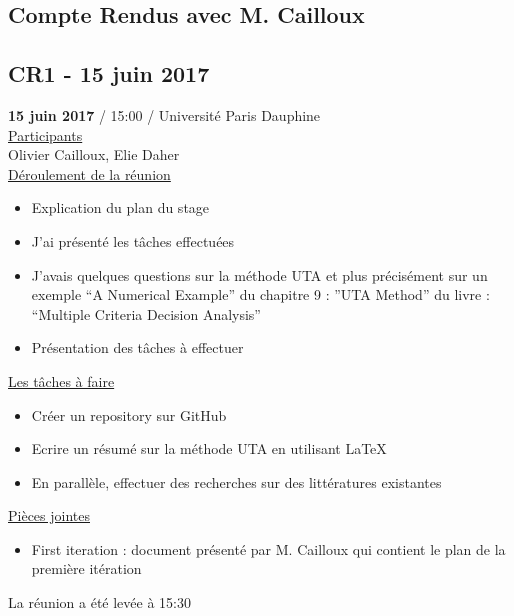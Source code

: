 \documentclass{report}
\begin{document}
\begin{appendices}

\chapter{Compte Rendus avec M. Cailloux}
\section{CR1 - 15 juin 2017}
\textbf{15 juin 2017} / 15:00 / Université Paris Dauphine \\

\underline{Participants} \\

Olivier Cailloux, Elie Daher\\

\underline{Déroulement de la réunion}\\
\begin{itemize}
	\item Explication du plan du stage
	\item J’ai présenté les tâches effectuées
	\item J’avais quelques questions sur la méthode UTA et plus précisément sur un exemple “A Numerical Example” du chapitre 9 : ”UTA Method” du livre : “Multiple Criteria Decision Analysis”
	\item Présentation des tâches à effectuer\\
\end{itemize}

\underline{Les tâches à faire} \\
\begin{itemize}
	\item Créer un repository sur GitHub
	\item Ecrire un résumé sur la méthode UTA en utilisant LaTeX
	\item En parallèle, effectuer des recherches sur des littératures existantes\\
\end{itemize}

\underline{Pièces jointes} \\
\begin{itemize}
	\item First iteration : document présenté par M. Cailloux qui contient le plan de la première itération\\
\end{itemize}

La réunion a été levée à 15:30\\


\end{appendices}
\end{document}
